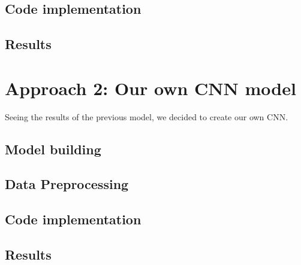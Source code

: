 \documentclass{article}
\begin{document}
    	\newpage
    	\subsection{Code implementation}
    	
    
    	\newpage
    	\subsection{Results}
    	
    	
    \newpage
    \section{Approach 2: Our own CNN model}
    Seeing the results of the previous model, we decided to create our own CNN.

    	    	
    	\subsection{Model building}
    	
    
    	\newpage
    	\subsection{Data Preprocessing}
    	
    	
    	\newpage
    	\subsection{Code implementation}
    	
    
    	\newpage
    	\subsection{Results}
    	

    
    
\end{document}
